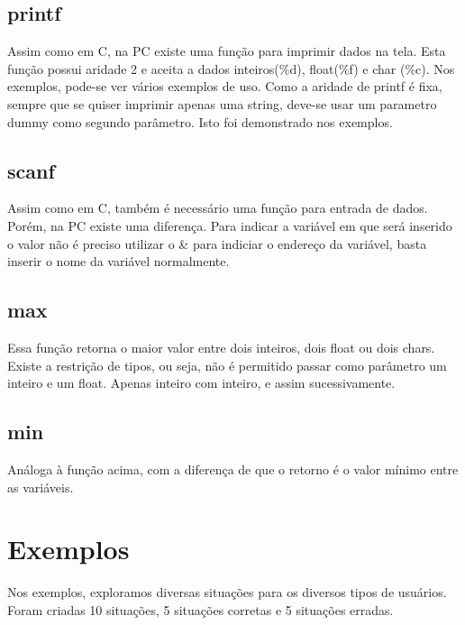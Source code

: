 \documentclass[a4paper,10pt]{article}
\begin{document}
\subsection{printf}
Assim como em C, na PC existe uma função para imprimir dados na tela. Esta função possui aridade 2 e aceita a dados inteiros(\%d), float(\%f) e char (\%c). Nos exemplos,
pode-se ver vários exemplos de uso. Como a aridade de printf é fixa, sempre que se quiser imprimir apenas uma string, deve-se usar um parametro dummy como
segundo parâmetro. Isto foi demonstrado nos exemplos.
\subsection{scanf}
Assim como em C, também é necessário uma função para entrada de dados. Porém, na PC existe uma diferença. Para indicar a variável em que será inserido o valor não é preciso 
utilizar o \& para indiciar o endereço da variável, basta inserir o nome da variável normalmente.
\subsection{max}
Essa função retorna o maior valor entre dois inteiros, dois float ou dois chars. Existe a restrição de tipos, ou seja, não é permitido passar como parâmetro um inteiro e um float. Apenas inteiro com inteiro, e assim sucessivamente.
\subsection{min}
Análoga à função acima, com a diferença de que o retorno é o valor mínimo entre as variáveis.
\section{Exemplos}

Nos exemplos, exploramos diversas situações para os diversos tipos de usuários. Foram criadas 10 situações, 5 situações corretas e 5 
situações erradas.
\end{document}
